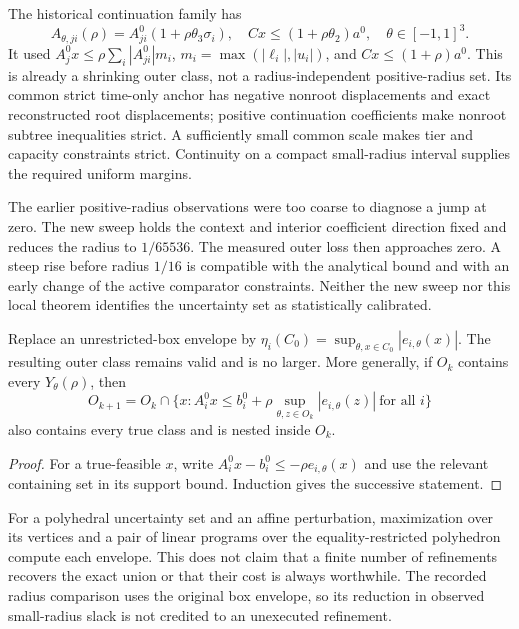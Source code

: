 \documentclass[11pt,letterpaper]{article}
\theoremstyle{definition}\newtheorem{remark}[theorem]{Remark}
\begin{document}
The historical continuation family has
\[
 A_{\theta,ji}(\rho)=A^0_{ji}(1+\rho\theta_3\sigma_i),\quad
 Cx\leq(1+\rho\theta_2)a^0,\quad \theta\in[-1,1]^3.
\]
It used $A_j^0x\leq\rho\sum_i|A^0_{ji}|m_i$, $m_i=\max(|\ell_i|,|u_i|)$, and $Cx\leq(1+\rho)a^0$. This is already a shrinking outer class, not a radius-independent positive-radius set. Its common strict time-only anchor has negative nonroot displacements and exact reconstructed root displacements; positive continuation coefficients make nonroot subtree inequalities strict. A sufficiently small common scale makes tier and capacity constraints strict. Continuity on a compact small-radius interval supplies the required uniform margins.

The earlier positive-radius observations were too coarse to diagnose a jump at zero. The new sweep holds the context and interior coefficient direction fixed and reduces the radius to $1/65536$. The measured outer loss then approaches zero. A steep rise before radius $1/16$ is compatible with the analytical bound and with an early change of the active comparator constraints. Neither the new sweep nor this local theorem identifies the uncertainty set as statistically calibrated.

\begin{corollary}\label{ec:refinement}
Replace an unrestricted-box envelope by
$\eta_i(C_0)=\sup_{\theta,x\in C_0}|e_{i,\theta}(x)|$.
The resulting outer class remains valid and is no larger. More generally, if $O_k$ contains every $Y_\theta(\rho)$, then
\[
 O_{k+1}=O_k\cap\{x:A_i^0x\leq b_i^0+\rho\sup_{\theta,z\in O_k}|e_{i,\theta}(z)|\ \text{for all }i\}
\]
also contains every true class and is nested inside $O_k$.
\end{corollary}
\begin{proof}
For a true-feasible $x$, write $A_i^0x-b_i^0\leq-\rho e_{i,\theta}(x)$ and use the relevant containing set in its support bound. Induction gives the successive statement.\end{proof}
For a polyhedral uncertainty set and an affine perturbation, maximization over its vertices and a pair of linear programs over the equality-restricted polyhedron compute each envelope. This does not claim that a finite number of refinements recovers the exact union or that their cost is always worthwhile. The recorded radius comparison uses the original box envelope, so its reduction in observed small-radius slack is not credited to an unexecuted refinement.
\end{document}

